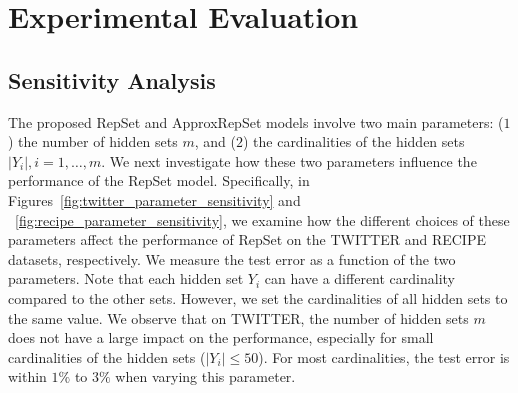 \documentclass[twoside]{article}
\begin{document}
\section{Experimental Evaluation}\label{sec:further_experiments}

\subsection{Sensitivity Analysis}
The proposed RepSet and ApproxRepSet models involve two main parameters:
($1$) the number of hidden sets $m$, and ($2$) the cardinalities of the hidden sets $|Y_i|, i=1,\ldots,m$.
We next investigate how these two parameters influence the performance of the RepSet model.
Specifically, in Figures~\ref{fig:twitter_parameter_sensitivity} and ~\ref{fig:recipe_parameter_sensitivity}, we examine how the different choices of these parameters affect the performance of RepSet on the TWITTER and RECIPE datasets, respectively. 
We measure the test error as a function of the two parameters.  
Note that each hidden set $Y_i$ can have a different cardinality compared to the other sets.
However, we set the cardinalities of all hidden sets to the same value.
We observe that on TWITTER, the number of hidden sets $m$ does not have a large impact on the performance, especially for small cardinalities of the hidden sets ($|Y_i| \leq 50$).
For most cardinalities, the test error is within $1\%$ to $3\%$ when varying this parameter.

\begin{figure*}[t]
\centering
    \begin{minipage}{\columnwidth}
    \centering


\end{minipage}\begin{minipage}{\columnwidth}
    \centering
\end{minipage}
\caption{Average test error of the RepSet model with respect to the number of hidden sets $m$ (left) and the size of the hidden sets $|Y_i|$ (right) on the TWITTER dataset.}
\label{fig:twitter_parameter_sensitivity}
\end{figure*}

\begin{figure*}[t]
\centering
    \begin{minipage}{\columnwidth}
    \centering
\end{minipage}\begin{minipage}{\columnwidth}
    \centering
\end{minipage}
\caption{Average test error of the RepSet model with respect to the number of hidden sets $m$ (left) and the size of the hidden sets $|Y_i|$ (right) on the RECIPE dataset.}
\label{fig:recipe_parameter_sensitivity}
\end{figure*}
\end{document}
